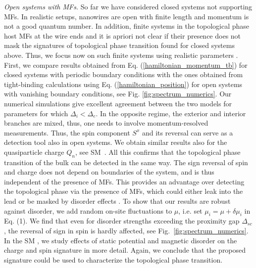 \documentclass[prl,twocolumn,showpacs,floatfix,amsbsy,amsbsy,superscriptaddress]{revtex4-1}
\begin{document}
{\it Open systems with MFs.}  So far we have considered closed systems not supporting MFs.
In  realistic setups, nanowires are open with finite length and momentum is not a good quantum number. 
In addition,  finite systems in the topological phase host MFs at the wire ends and it is apriori not clear if their presence does not mask the signatures of topological phase transition found for closed systems above.
 Thus, we focus now on such finite systems
using realistic parameters \cite{Mourik,Kammhuber2017}. First, we compare results obtained from Eq. (\ref{hamiltonian_momentum_tb}) for closed systems with periodic boundary conditions with the ones obtained from tight-binding calculations using Eq. (\ref{hamiltonian_position})  for open systems with vanishing boundary conditions, see  Fig. \ref{fig:spectrum_numerics}. Our numerical simulations give excellent agreement between the two models for parameters for which $\Delta_{i}<\Delta_{e}$. In the opposite regime, the exterior and interior branches are mixed, thus, one needs to involve momentum-resolved measurements. 
 Thus,
 the spin component $S^x$ and its reversal can serve as a detection tool also in open systems.  We obtain  similar results also for the quasiparticle charge $Q_n$, see SM~\cite{SM}. All this confirms that the topological phase transition of the bulk  can be detected in the same way. The sign reversal of spin and charge  does not depend on boundaries of the system, and is thus  independent of the presence of MFs. This provides an advantage over detecting the topological phase via the presence of MFs, which could either leak into the lead \cite{composite_majorana} or be masked by disorder effects \cite{Pikulin2012,Diego,Liu2012,Atland2012}. To show that our results are robust against disorder, we add random on-site fluctuations to $\mu$, i.e. set $\mu_i=\mu + \delta \mu_i$ in Eq. (1). We find that even for disorder strengths exceeding the proximity gap $\Delta_{sc}$, the reversal of sign in spin is hardly affected, see Fig.~\ref{fig:spectrum_numerics}. In the SM \cite{SM}, we study effects of static potential and magnetic disorder on the charge and spin signature in more detail.  Again, we conclude that the proposed signature could be used to characterize the topological phase transition.
\end{document}
